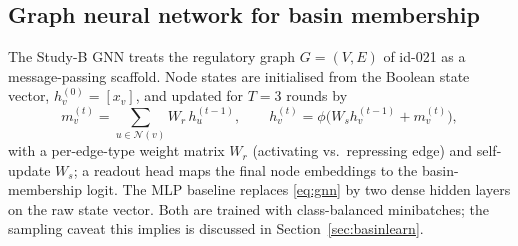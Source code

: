 \subsection{Graph neural network for basin membership}
\label{sec:math-gnn}

The Study-B GNN treats the regulatory graph $G = (V, E)$ of id-021 as a
message-passing scaffold. Node states are initialised from the Boolean state
vector, $h_v^{(0)} = [x_v]$, and updated for $T = 3$ rounds by
\begin{equation}
m_v^{(t)} = \sum_{u \in \mathcal{N}(v)} W_r\, h_u^{(t-1)}, \qquad
h_v^{(t)} = \phi\!\big( W_s h_v^{(t-1)} + m_v^{(t)} \big),
\label{eq:gnn}
\end{equation}
with a per-edge-type weight matrix $W_r$ (activating vs.\ repressing edge)
and self-update $W_s$; a readout head maps the final node embeddings to the
basin-membership logit. The MLP baseline replaces \eqref{eq:gnn} by two dense
hidden layers on the raw state vector. Both are trained with class-balanced
minibatches; the sampling caveat this implies is discussed in
Section~\ref{sec:basinlearn}.
